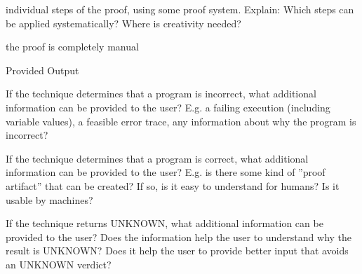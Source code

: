 \documentclass[a4paper]{article}
\begin{document}
\begin{minipage}[t]{0.16\linewidth}
\begin{betterlist}
\begin{betterlist}
			\item \checkboxUnchecked individual steps of the proof, using some proof system. Explain: Which steps can be applied systematically? Where is creativity needed?

			\item \checkboxUnchecked the proof is completely manual
		\end{betterlist}
		\item \alert{Provided Output}
		\begin{betterlist}
			\item If the technique determines that a program is incorrect, what additional information can be provided to the user? E.g. a failing execution (including variable values), a feasible error trace, any information about why the program is incorrect?

			\item If the technique determines that a program is correct, what additional information can be provided to the user? E.g. is there some kind of ”proof artifact” that can be created? If so, is it easy to understand for humans? Is it usable by machines?

			\item If the technique returns UNKNOWN, what additional information can be provided to the user? Does the information help the user to understand why the result is UNKNOWN? Does it help the user to provide better input that avoids an UNKNOWN verdict?


\end{betterlist}
\end{betterlist}
\end{minipage}
\end{document}

